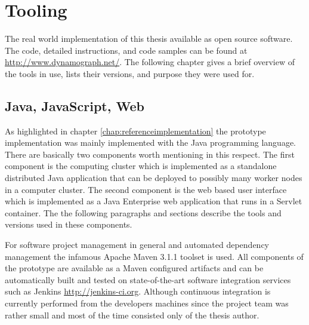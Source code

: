 \chapter{Tooling}
\label{appendix:tooling}

\newcommand{\versionEL}{2.2}
\newcommand{\versionJava}{1.7.0\_45-b18}
\newcommand{\versionJSF}{2.1.7}
\newcommand{\versionJSP}{2.2}
\newcommand{\versionMaven}{3.1.1}
\newcommand{\versionObjectAid}{1.1.6}
\newcommand{\versionPrimeFaces}{3.3.1}
\newcommand{\versionServlet}{3.0}
\newcommand{\versionSigmaJS}{0.1}
\newcommand{\versionSpring}{3.1.1}
\newcommand{\versionSpringWebflow}{2.3.1}
\newcommand{\versionTomcat}{7.0.29}
\newcommand{\versionZooKeeper}{3.4.5}

The real world implementation of this thesis available as open source software. The code, detailed instructions, and code samples can be found at \url{http://www.dynamograph.net/}. The following chapter gives a brief overview of the tools in use, lists their versions, and purpose they were used for.

\section{Java, JavaScript, Web}

As highlighted in chapter \ref{chap:referenceimplementation} the prototype implementation was mainly implemented with the Java programming language. There are basically two components worth mentioning in this respect. The first component is the computing cluster which is implemented as a standalone distributed Java application that can be deployed to possibly many worker nodes in a computer cluster. The second component is the web based user interface which is implemented as a Java Enterprise web application that runs in a Servlet container. The the following paragraphs and sections describe the tools and versions used in these components.

For software project management in general and automated dependency management the infamous Apache Maven \versionMaven{} toolset is used. All components of the prototype are available as a Maven configured artifacts and can be automatically built and tested on state-of-the-art software integration services such as Jenkins \url{http://jenkins-ci.org}. Although continuous integration is currently performed from the developers machines since the project team was rather small and most of the time consisted only of the thesis author.

